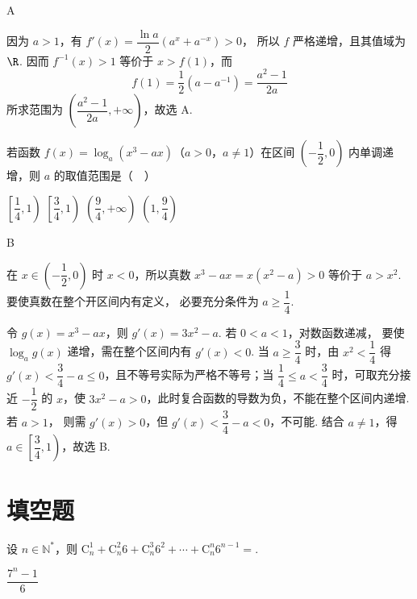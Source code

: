 \begin{answer}
A
\end{answer}

\begin{solution}
因为 \(a>1\)，有 \(f'(x)=\dfrac{\ln a}{2}(a^x+a^{-x})>0\)，
所以 \(f\) 严格递增，且其值域为 \(\R\). 因而
\(f^{-1}(x)>1\) 等价于 \(x>f(1)\)，而
\[
f(1)=\frac12(a-a^{-1})=\frac{a^2-1}{2a}
\]
所求范围为 \(\left(\dfrac{a^2-1}{2a},+\infty\right)\)，故选 A.
\end{solution}

\begin{problem}
若函数 \(f(x)=\log_a(x^3-ax)\)（\(a>0\)，\(a\ne1\)）在区间
\(\left(-\dfrac12,0\right)\) 内单调递增，则 \(a\) 的取值范围是（\(\quad\)）

\choices
    {\(\left[\dfrac14,1\right)\)}
    {\(\left[\dfrac34,1\right)\)}
    {\(\left(\dfrac94,+\infty\right)\)}
    {\(\left(1,\dfrac94\right)\)}
\end{problem}

\begin{answer}
B
\end{answer}

\begin{solution}
在 \(x\in\left(-\dfrac12,0\right)\) 时 \(x<0\)，所以真数
\(x^3-ax=x(x^2-a)>0\) 等价于 \(a>x^2\). 要使真数在整个开区间内有定义，
必要充分条件为 \(a\geqslant\dfrac14\).

令 \(g(x)=x^3-ax\)，则 \(g'(x)=3x^2-a\). 若 \(0<a<1\)，对数函数递减，
要使 \(\log_a g(x)\) 递增，需在整个区间内有 \(g'(x)<0\). 当
\(a\geqslant\dfrac34\) 时，由 \(x^2<\dfrac14\) 得
\(g'(x)<\dfrac34-a\leqslant0\)，且不等号实际为严格不等号；当
\(\dfrac14\leqslant a<\dfrac34\) 时，可取充分接近 \(-\dfrac12\) 的 \(x\)，使
\(3x^2-a>0\)，此时复合函数的导数为负，不能在整个区间内递增. 若 \(a>1\)，
则需 \(g'(x)>0\)，但 \(g'(x)<\dfrac34-a<0\)，不可能. 结合 \(a\ne1\)，得
\(a\in\left[\dfrac34,1\right)\)，故选 B.
\end{solution}

\section{填空题}

\begin{problem}
设 \(n\in\mathbb N^*\)，则
\(\mathrm C_n^1+\mathrm C_n^2 6+\mathrm C_n^3 6^2+\cdots+\mathrm C_n^n6^{n-1}=\)\fillinblank{}.
\end{problem}

\begin{answer}
\(\dfrac{7^n-1}{6}\)
\end{answer}

